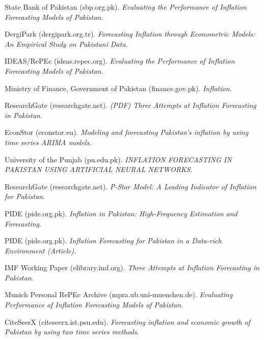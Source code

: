 \documentclass[12pt,a4paper]{article}
\begin{document}






%
\begin{thebibliography}{99} %

 State Bank of Pakistan (sbp.org.pk). \emph{Evaluating the Performance of Inflation Forecasting Models of Pakistan}.

 DergiPark (dergipark.org.tr). \emph{Forecasting Inflation through Econometric Models: An Empirical Study on Pakistani Data}.

 IDEAS/RePEc (ideas.repec.org). \emph{Evaluating the Performance of Inflation Forecasting Models of Pakistan}.

 Ministry of Finance, Government of Pakistan (finance.gov.pk). \emph{Inflation}.

 ResearchGate (researchgate.net). \emph{(PDF) Three Attempts at Inflation Forecasting in Pakistan}.

 EconStor (econstor.eu). \emph{Modeling and forecasting Pakistan's inflation by using time series ARIMA models}.

 University of the Punjab (pu.edu.pk). \emph{INFLATION FORECASTING IN PAKISTAN USING ARTIFICIAL NEURAL NETWORKS}.

 ResearchGate (researchgate.net). \emph{P-Star Model: A Leading Indicator of Inflation for Pakistan}.

 PIDE (pide.org.pk). \emph{Inflation in Pakistan: High-Frequency Estimation and Forecasting}.

 PIDE (pide.org.pk). \emph{Inflation Forecasting for Pakistan in a Data-rich Environment (Article)}.

 IMF Working Paper (elibrary.imf.org). \emph{Three Attempts at Inflation Forecasting in Pakistan}.

 Munich Personal RePEc Archive (mpra.ub.uni-muenchen.de). \emph{Evaluating Performance of Inflation Forecasting Models of Pakistan}.

 CiteSeerX (citeseerx.ist.psu.edu). \emph{Forecasting inflation and economic growth of Pakistan by using two time series methods}.


\end{thebibliography}
\end{document}

